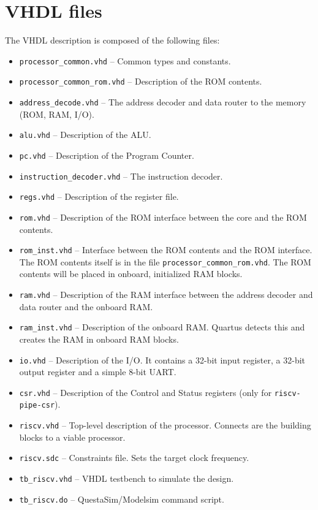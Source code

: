\documentclass[12pt]{article}
\begin{document}
\section{VHDL files}
The VHDL description is composed of the following files:

\begin{itemize}
\item \lstinline|processor_common.vhd| -- Common types and constants.
\item \lstinline|processor_common_rom.vhd| -- Description of the ROM contents.
\item \lstinline|address_decode.vhd| -- The address decoder and data router to the memory (ROM, RAM, I/O).
\item \lstinline|alu.vhd| -- Description of the ALU.
\item \lstinline|pc.vhd| -- Description of the Program Counter.
\item \lstinline|instruction_decoder.vhd| -- The instruction decoder.
\item \lstinline|regs.vhd| -- Description of the register file.
\item \lstinline|rom.vhd| -- Description of the ROM interface between the core and the ROM contents.
\item \lstinline|rom_inst.vhd| -- Interface between the ROM contents and the ROM interface. The ROM contents itself is in the file \lstinline|processor_common_rom.vhd|. The ROM contents will be placed in onboard, initialized RAM blocks. 
\item \lstinline|ram.vhd| -- Description of the RAM interface between the address decoder and data router and the onboard RAM.
\item \lstinline|ram_inst.vhd| -- Description of the onboard RAM. Quartus detects this and creates the RAM in onboard RAM blocks.
\item \lstinline|io.vhd| -- Description of the I/O. It contains a 32-bit input register, a 32-bit output register and a simple 8-bit UART.
\item \lstinline|csr.vhd| -- Description of the Control and Status registers (only for \texttt{riscv-pipe-csr}).
\item \lstinline|riscv.vhd| -- Top-level description of the processor. Connects are the building blocks to a viable processor.
\item \lstinline|riscv.sdc| -- Constraints file. Sets the target clock frequency.
\item \lstinline|tb_riscv.vhd| -- VHDL testbench to simulate the design.
\item \lstinline|tb_riscv.do| -- QuestaSim/Modelsim command script.
\end{itemize}
\end{document}
